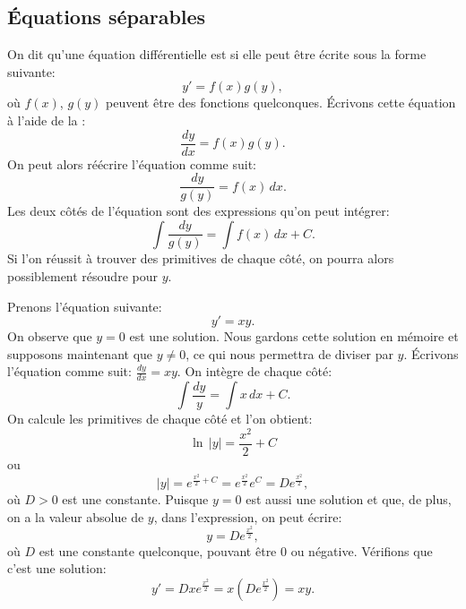 \subsection{Équations séparables}

On dit qu'une équation différentielle est \emph{}
si elle peut être écrite sous la forme suivante:
\begin{equation*}
	y' = f(x)g(y),
\end{equation*}
où $f(x)$, $g(y)$ peuvent être des fonctions quelconques.
Écrivons cette équation à l'aide de la :
\begin{equation*}
	\frac{dy}{dx} = f(x)g(y) .
\end{equation*}
On peut alors réécrire l'équation comme suit:
\begin{equation*}
	\frac{dy}{g(y)} = f(x) \,dx .
\end{equation*}
Les deux côtés de l'équation sont des expressions qu'on peut intégrer:
\begin{equation*}
	\int \frac{dy}{g(y)} = \int f(x) \,dx + C .
\end{equation*}
Si l'on réussit à trouver des primitives de chaque côté, on pourra alors possiblement résoudre pour $y$.

\begin{example} \label{example:yprimeisxy}
	Prenons l'équation  suivante:
	\begin{equation*}
		y' = xy .
	\end{equation*}
	On observe que $y=0$ est une solution.  Nous gardons cette solution en mémoire et supposons maintenant que
	$y \not =0$, ce qui nous permettra de diviser par $y$.
	Écrivons l'équation comme suit: $\frac{dy}{dx} = xy$.  On intègre de chaque côté:
	\begin{equation*}
		\int \frac{dy}{y} = \int x\,dx + C .
	\end{equation*}
	On calcule les primitives de chaque côté et l'on obtient:
	\begin{equation*}
		\ln \, \lvert y\rvert = \frac{x^2}{2} + C
	\end{equation*}
	ou
	\begin{equation*}
		\lvert y \rvert = e^{\frac{x^2}{2} + C} = e^{\frac{x^2}{2}} e^C = D e^{\frac{x^2}{2}} ,
	\end{equation*}
	où $D > 0$ est une constante.  Puisque $y=0$ est aussi une solution et que, de plus, on a la valeur absolue de $y$, dans l'expression, on peut écrire:
	\begin{equation*}
		y = D e^{\frac{x^2}{2}} ,
	\end{equation*}
	où $D$ est une constante quelconque, pouvant être 0 ou négative.  Vérifions que c'est une solution:
	\begin{equation*}
		y' = D x e^{\frac{x^2}{2}} = x \left( D e^{\frac{x^2}{2}} \right) = xy .
	\end{equation*}
\end{example}

